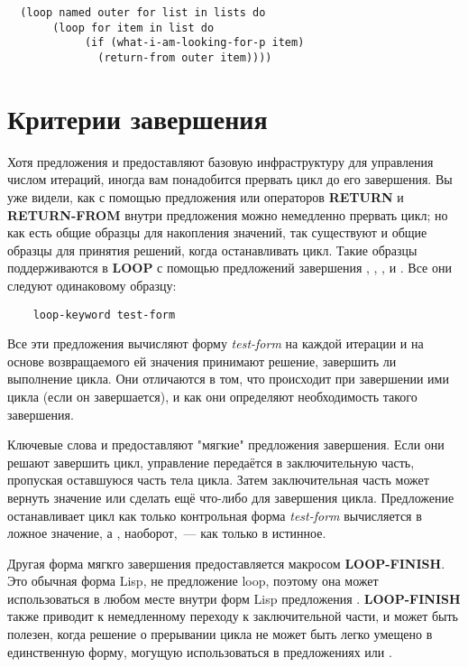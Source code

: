 \begin{lstlisting}
  (loop named outer for list in lists do
       (loop for item in list do
            (if (what-i-am-looking-for-p item)
              (return-from outer item))))
\end{lstlisting}

\section{Критерии завершения}

Хотя предложения  и  предоставляют базовую инфраструктуру для
управления числом итераций, иногда вам понадобится прервать цикл до его завершения. Вы уже
видели, как с помощью предложения  или операторов \textbf{RETURN} и
\textbf{RETURN-FROM} внутри предложения  можно немедленно прервать цикл; но как
есть общие образцы для накопления значений, так существуют и общие образцы для принятия
решений, когда останавливать цикл. Такие образцы поддерживаются в \textbf{LOOP} с помощью
предложений завершения , , ,  и
. Все они следуют одинаковому образцу:

\begin{verbatim}
    loop-keyword test-form
\end{verbatim}

Все эти предложения вычисляют форму \textit{test-form} на каждой итерации и на основе
возвращаемого ей значения принимают решение, завершить ли выполнение цикла. Они отличаются
в том, что происходит при завершении ими цикла (если он завершается), и как они определяют
необходимость такого завершения.

Ключевые слова   и  предоставляют "мягкие" предложения
завершения. Если они решают завершить цикл, управление передаётся в заключительную часть,
пропуская оставшуюся часть тела цикла. Затем заключительная часть может вернуть значение
или сделать ещё что-либо для завершения цикла. Предложение  останавливает цикл
как только контрольная форма \textit{test-form} вычисляется в ложное значение, а
, наоборот,~--- как только в истинное.

Другая форма мягкго завершения предоставляется макросом \textbf{LOOP-FINISH}. Это обычная
форма Lisp, не предложение loop, поэтому она может использоваться в любом месте внутри
форм Lisp предложения . \textbf{LOOP-FINISH} также приводит к немедленному
переходу к заключительной части, и может быть полезен, когда решение о прерывании цикла не
может быть легко умещено в единственную форму, могущую использоваться в предложениях
 или .

